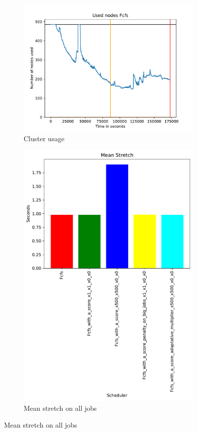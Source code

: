 \documentclass[a4paper]{article}
\begin{document}
\begin{figure}[H]\centering
\begin{subfigure}[b]{0.4\linewidth}\centering\includegraphics[width=0.9\linewidth]{MBSS/plot/2022-01-21->2022-01-21_V9271_sparse_50_Fcfs_Used_nodes_450_128_32_256_4_1024.pdf}\caption{Cluster usage}\end{subfigure}
\begin{subfigure}[b]{0.4\linewidth}\centering\includegraphics[width=0.9\linewidth]{MBSS/plot/Results_FCFS_Score_Adaptative_Multiplier_2022-01-21->2022-01-21_V9271_sparse_50_Mean_Stretch_450_128_32_256_4_1024.pdf}\caption{Mean stretch on all jobs}\end{subfigure}

\end{figure}
\end{document}
